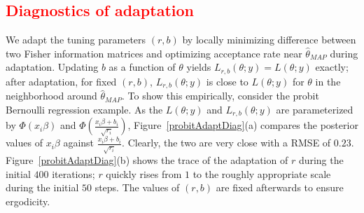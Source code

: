 \documentclass[11pt]{article}
\newcommand{\leo}[1]{{\textcolor{red}{#1}}}
\begin{document}
\leo{
\subsection{Diagnostics of adaptation}
}
We adapt the tuning parameters $(r,b)$ by locally minimizing difference between two Fisher information matrices and
 optimizing acceptance rate near 
 $\hat\theta_{MAP}$ during adaptation. Updating $b$  as a function
 of $\theta$ yields $L_{r,b}(\theta;y)=L(\theta;y)$ exactly;  after adaptation,
for  fixed
 $(r,b)$, $L_{r,b}(\theta;y)$ is close to $L(\theta;y)$ for $\theta$ in the neighborhood
 around $\hat\theta_{MAP}$. To show this empirically, consider the
 probit Bernoulli regression example. As the $L(\theta;y)$ and $L_{r,b}(\theta;y)$
 are parameterized by $\Phi(x_i\beta)$ and $\Phi(\frac{x_i\beta+b_i}{\sqrt{r_i}})$, Figure~\ref{probitAdaptDiag}(a) compares the posterior values of $x_i\beta$ against
$\frac{x_i\beta+b_i}{\sqrt{r_i}}$. Clearly, the two are very close with a
RMSE of $0.23$.
Figure~\ref{probitAdaptDiag}(b) shows the trace of the adaptation of $r$
during
the initial $400$ iterations;
$r$ quickly rises from $1$ to the roughly  appropriate scale during the
initial $50$ steps. The values of $(r,b)$ are fixed afterwards to ensure
ergodicity.
\end{document}
